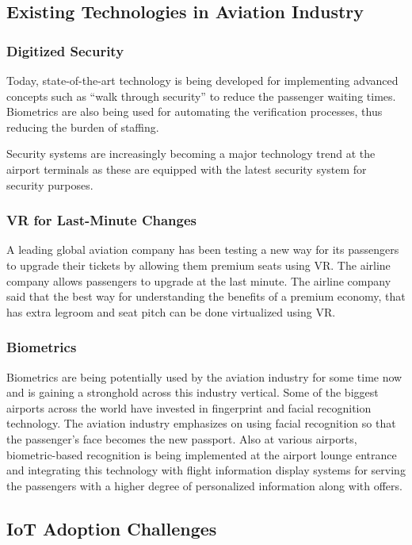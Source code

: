 \documentclass[a4paper,12pt]{book}
\begin{document}
\subsection{Existing Technologies in Aviation Industry}
\subsubsection{Digitized Security}
Today, state-of-the-art technology is being developed for implementing advanced concepts such as “walk through security” to reduce the passenger waiting times. Biometrics are also being used for automating the verification processes, thus reducing the burden of staffing.

Security systems are increasingly becoming a major technology trend at the airport terminals as these are equipped with the latest security system for security purposes.

\subsubsection{VR for Last-Minute Changes}
A leading global aviation company has been testing a new way for its passengers to upgrade their tickets by allowing them premium seats using VR. The airline company allows passengers to upgrade at the last  minute. The airline company said that the best way for understanding the benefits of a premium economy, that has extra legroom and seat pitch can be done virtualized using VR.

\subsubsection{Biometrics}
Biometrics are being potentially used by the aviation industry for some time now and is gaining a stronghold across this industry vertical. Some of the biggest airports across the world have invested in fingerprint and facial recognition technology. The aviation industry emphasizes on using facial recognition so that the passenger’s face becomes the new passport. Also at various airports, biometric-based recognition is being implemented at the airport lounge entrance and integrating this technology with flight information display systems for serving the passengers with a higher degree of personalized information along with offers.

\subsection{IoT Adoption Challenges}
\end{document}
